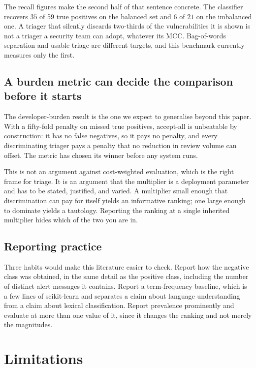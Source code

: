 \documentclass[journal]{IEEEtran}
\theoremstyle{definition}
\newcommand{\RNtp}{59}
\begin{document}
The recall figures make the second half of that sentence concrete. The
classifier recovers $35$ of \RNtp{} true positives on the balanced set and $6$
of $21$ on the imbalanced one. A triager that silently discards two-thirds of
the vulnerabilities it is shown is not a triager a security team can adopt,
whatever its MCC. Bag-of-words separation and usable triage are different
targets, and this benchmark currently measures only the first.

\subsection{A burden metric can decide the comparison before it starts}
The developer-burden result is the one we expect to generalise beyond this
paper. With a fifty-fold penalty on missed true positives, accept-all is
unbeatable by construction: it has no false negatives, so it pays no penalty,
and every discriminating triager pays a penalty that no reduction in review
volume can offset. The metric has chosen its winner before any system runs.

This is not an argument against cost-weighted evaluation, which is the right
frame for triage. It is an argument that the multiplier is a deployment
parameter and has to be stated, justified, and varied. A multiplier small enough
that discrimination can pay for itself yields an informative ranking; one large
enough to dominate yields a tautology. Reporting the ranking at a single
inherited multiplier hides which of the two you are in.

\subsection{Reporting practice}
Three habits would make this literature easier to check. Report how the negative
class was obtained, in the same detail as the positive class, including the
number of distinct alert messages it contains. Report a term-frequency baseline,
which is a few lines of scikit-learn and separates a claim about language
understanding from a claim about lexical classification. Report prevalence
prominently and evaluate at more than one value of it, since it changes the
ranking and not merely the magnitudes.

\section{Limitations}
\label{sec:limitations}
\end{document}
